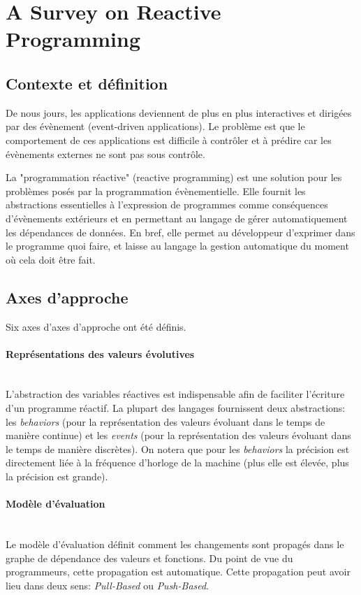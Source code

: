 \documentclass[11pt]{article}
\begin{document}
{\centering
\section*{A Survey on Reactive Programming}}
\begin{multicols}{2}

\subsection*{Contexte et définition}
De nous jours, les applications deviennent de plus en plus interactives et dirigées par des évènement (event-driven applications). Le problème est que le comportement de ces applications est difficile à contrôler et à prédire car les évènements externes ne sont pas sous contrôle.

La "programmation réactive" (reactive programming) est une solution pour les problèmes posés par la programmation évènementielle. Elle fournit les abstractions essentielles à l'expression de programmes comme conséquences d'évènements extérieurs et en permettant au langage de gérer automatiquement les dépendances de données. En bref, elle permet au développeur d'exprimer dans le programme quoi faire, et laisse au langage la gestion automatique du moment où cela doit être fait.

\subsection*{Axes d'approche}
Six axes d'axes d'approche ont été définis.

\paragraph{Représentations des valeurs évolutives}
~~\\
L'abstraction des variables réactives est indispensable afin de faciliter l'écriture d'un programme réactif. La plupart des langages fournissent deux abstractions: les \textit{behaviors} (pour la représentation des valeurs évoluant dans le temps de manière continue) et les \textit{events} (pour la représentation des valeurs évoluant dans le temps de manière discrètes). On notera que pour les \textit{behaviors} la précision est directement liée à la fréquence d'horloge de la machine (plus elle est élevée, plus la précision est grande).

\paragraph{Modèle d'évaluation}~~\\
Le modèle d'évaluation définit comment les changements sont propagés dans le graphe de dépendance des valeurs et fonctions. Du point de vue du programmeurs, cette propagation est automatique. Cette propagation peut avoir lieu dans deux sens: \textit{Pull-Based} ou \textit{Push-Based}.


\end{multicols}
\end{document}
